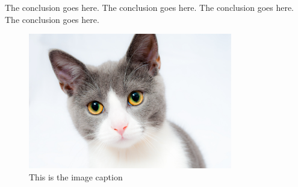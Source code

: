 \documentclass[10pt,conference,compsocconf]{IEEEtran}
\begin{document}
The conclusion goes here. The conclusion goes here. The conclusion goes here.
The conclusion goes here.

\begin{figure}[htbp]
\centering
\includegraphics[width=3.5in]{img/test1_cat.jpg}
\caption{This is the image caption}
\label{image_label}
\end{figure}



\end{document}
